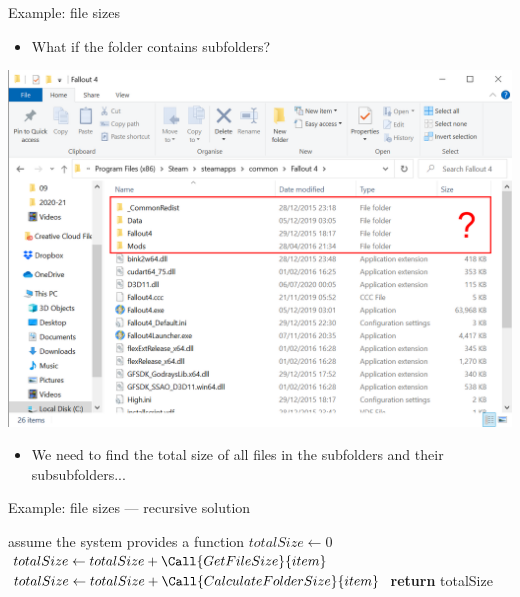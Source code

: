 \begin{frame}{Example: file sizes}
    \begin{itemize}
        \item What if the folder contains subfolders?
    \end{itemize}
    \begin{center}
        \includegraphics[height=0.5\textheight]{filesizes_2}
    \end{center}
    \begin{itemize}
        \pause\item We need to find the total size of all files in the subfolders and their subsubfolders...
    \end{itemize}
\end{frame}

\begin{frame}{Example: file sizes --- recursive solution}
    \footnotesize
    \begin{algorithmic}
        \State assume the system provides a  function \pause
         \pause
            \State $totalSize \gets 0$ \pause
             \pause
                    \State $totalSize \gets totalSize + \Call{GetFileSize}{item}$ \pause
                    \State $totalSize \gets totalSize + \Call{CalculateFolderSize}{item}$ \pause
                \EndIf
            \EndFor
            \State \textbf{return} totalSize \pause
        \EndProcedure
    \end{algorithmic}
\end{frame}

